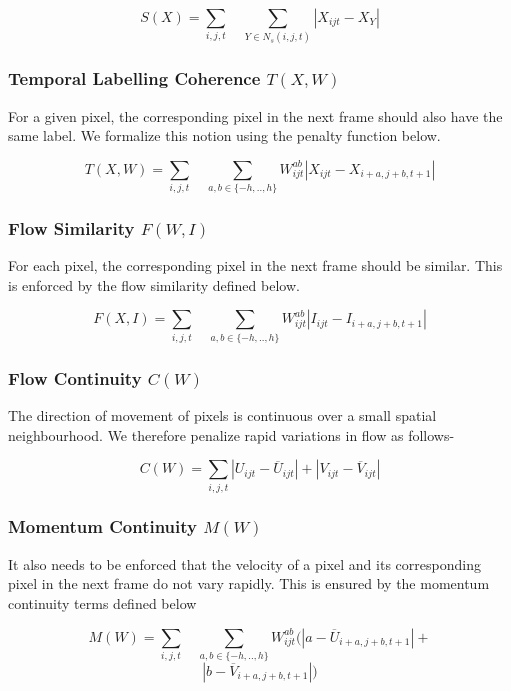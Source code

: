 \begin{equation} \label{eq: SLC}
S(X)=\underset{i,j,t}{\sum}\quad\underset{Y\in N_{s}(i,j,t)}{\sum}|X_{ijt}-X_{Y}|
\end{equation}



\subsubsection*{Temporal Labelling Coherence $T(X,W)$}

For a given pixel, the corresponding pixel in the next frame should
also have the same label. We formalize this notion using the penalty
function below.

\begin{equation} \label{eq: TLC}
T(X,W)=\underset{i,j,t}{\sum}\quad\underset{a,b\in\{-h,..,h\}}{\sum}W_{ijt}^{ab}|X_{ijt}-X_{i+a,j+b,t+1}|
\end{equation}



\subsubsection*{Flow Similarity $F(W,I)$}

For each pixel, the corresponding pixel in the next frame should be
similar. This is enforced by the flow similarity defined below.

\begin{equation}
F(X,I)=\underset{i,j,t}{\sum}\quad\underset{a,b\in\{-h,..,h\}}{\sum}W_{ijt}^{ab}|I_{ijt}-I_{i+a,j+b,t+1}|
\end{equation}



\subsubsection*{Flow Continuity $C(W)$}

The direction of movement of pixels is continuous over a small spatial
neighbourhood. We therefore penalize rapid variations in flow as follows-

\begin{equation}
C(W)=\underset{i,j,t}{\sum}|U_{ijt}-\overline{U}_{ijt}|+|V_{ijt}-\overline{V}_{ijt}|
\end{equation}



\subsubsection*{Momentum Continuity $M(W)$}

It also needs to be enforced that the velocity of a pixel and its
corresponding pixel in the next frame do not vary rapidly. This is
ensured by the momentum continuity terms defined below

\begin{equation}
M(W)=\underset{i,j,t}{\sum}\quad\underset{a,b\in\{-h,..,h\}}{\sum}W_{ijt}^{ab}(|a-\overline{U}_{i+a,j+b,t+1}|+
\end{equation}
\[|b-\overline{V}_{i+a,j+b,t+1}|)
\]


